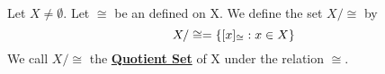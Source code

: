 \newcommand{\QuotientSet}[0]{\textbf{\hyperref[def:QuotientSet]{Quotient Set}}\xspace}
\newcommand{\QuoSet}[2]{\ensuremath{#1/#2}\xspace}
\newcommand{\LetBeQuotientSet}[2]{
    Let \ensuremath{\QuoSet{#1}{#2}} be the \QuotientSet of \ensuremath{#1} with respect to the relation \ensuremath{#2}.
}
\begin{df}  
\label{def:QuotientSet}
\rm
    Let $X \neq \emptyset$.
    Let $\cong$ be an 
	\EquivalenceRelation defined on X.
    We define the set $X/\cong$ by 
    \begin{equation}
        \QuoSet{X}{\cong} = \braces{ [x]_{\cong} : x \in X}
    \end{equation}
    We call $\QuoSet{X}{\cong}$ the \QuotientSet of X under the relation $\cong$. 
\end{df} 
